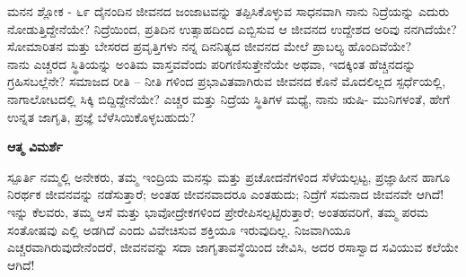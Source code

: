 \begin{mananam}{\mananamfont ಮನನ ಶ್ಲೋಕ - ೬೯}
\footnotesize \mananamtext ದೈನಂದಿನ ಜೀವನದ ಜಂಜಾಟವನ್ನು ತಪ್ಪಿಸಿಕೊಳ್ಳುವ ಸಾಧನವಾಗಿ ನಾನು ನಿದ್ರೆಯನ್ನು ಎದುರು ನೋಡುತ್ತಿದ್ದೇನೆಯೇ? ನಿದ್ರೆಯಿಂದ, ಪ್ರತಿದಿನ ಉತ್ಸಾಹದಿಂದ ಎಬ್ಬಿಸುವ ಆ  ಜೀವನದ ಉದ್ದೇಶದ ಅರಿವು ನನಗಿದೆಯೇ?  ಸೋಮಾರಿತನ ಮತ್ತು ಬೇಸರದ ಪ್ರವೃತ್ತಿಗಳು ನನ್ನ ದಿನನಿತ್ಯದ ಜೀವನದ ಮೇಲೆ ಪ್ರಾಬಲ್ಯ ಹೊಂದಿವೆಯೇ?\\
ನಾನು ಎಚ್ಚರದ ಸ್ಥಿತಿಯನ್ನು ಅಂತಿಮ ವಾಸ್ತವವೆಂದು ಪರಿಗಣಿಸುತ್ತೇನೆಯೇ ಅಥವಾ, ಇದಕ್ಕಿಂತ ಹೆಚ್ಚಿನದನ್ನು ಗ್ರಹಿಸಬಲ್ಲೆನೇ? ಸಮಾಜದ ರೀತಿ – ನೀತಿ ಗಳಿಂದ ಪ್ರಭಾವಿತವಾಗಿರುವ ಜೀವನದ ಕೊನೆ ಮೊದಲಿಲ್ಲದ ಸ್ಪರ್ಧೆಯಲ್ಲಿ, ನಾಗಾಲೋಟದಲ್ಲಿ ಸಿಕ್ಕಿ ಬಿದ್ದಿದ್ದೇನೆಯೇ? ಎಚ್ಚರ ಮತ್ತು ನಿದ್ರೆಯ  ಸ್ಥಿತಿಗಳ  ಮಧ್ಯೆ,  ನಾನು ಋಷಿ- ಮುನಿಗಳಂತೆ,  ಹೇಗೆ ಉನ್ನತ ಜಾಗೃತಿ, ಪ್ರಜ್ಞೆ ಬೆಳೆಸಿಯಿಕೊಳ್ಳಬಹುದು?

\end{mananam}
\WritingHand\enspace\textbf{ಆತ್ಮ ವಿಮರ್ಶೆ}
\begin{inspiration}{\mananamfont ಸ್ಪೂರ್ತಿ}
\footnotesize \mananamtext ನಮ್ಮಲ್ಲಿ ಅನೇಕರು, ತಮ್ಮ ಇಂದ್ರಿಯ ಮನಸ್ಸು ಮತ್ತು ಪ್ರಚೋದನೆಗಳಿಂದ ಸೆಳೆಯಲ್ಪಟ್ಟ, ಪ್ರಜ್ಞಾಹೀನ ಹಾಗೂ ನಿರರ್ಥಕ   ಜೀವನವನ್ನು ನಡೆಸುತ್ತಾರೆ; ಅಂತಹ ಜೀವನವಾದರೂ ಎಂತಹುದು; ನಿದ್ರೆಗೆ ಸಮನಾದ ಜೀವನವೇ ಆಗಿದೆ! ಇನ್ನು ಕೆಲವರು, ತಮ್ಮ ಆಸೆ ಮತ್ತು ಭಾವೋದ್ರೇಕಗಳಿಂದ ಪ್ರೇರೇಪಿಸಲ್ಪಟ್ಟಿರುತ್ತಾರೆ; ಅಂತಹವರಿಗೆ, ತಮ್ಮ ಪರಮ ಸಂತೋಷವು ಎಲ್ಲಿ ಅಡಗಿದೆ ಎಂದು ವಿವೇಚಿಸುವ ಶಕ್ತಿಯೂ ಇರುವುದಿಲ್ಲ. ನಿಜವಾಗಿಯೂ ಎಚ್ಚರವಾಗಿರುವುದೇನೆಂದರೆ, ಜೀವನವನ್ನು ಸದಾ ಜಾಗೃತಾವಸ್ಥೆಯಿಂದ ಜೇವಿಸಿ, ಅದರ ರಸಾಸ್ವಾದ  ಸವಿಯುವ ಕಲೆಯೇ ಆಗಿದೆ!
\end{inspiration}
\newpage


